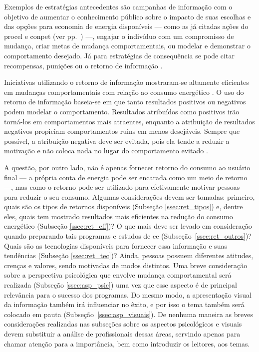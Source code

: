 Exemplos de estratégias antecedentes são campanhas de informação 
com o objetivo de aumentar o conhecimento público sobre o impacto de suas 
escolhas e das opções para economia de energia disponíveis --- como 
as já citadas ações do \gls{procel} e \gls{conpet} (ver pp.~\pageref{text:prog_cepel}) ---,
engajar o indivíduo com um compromisso de mudança, criar metas de mudança
comportamentais, ou modelar e demonstrar o comportamento desejado. Já para
estratégias de consequência se pode citar recompensas, punições ou o
retorno de informação \cite{aceee_2010_estudos_feedback,2009_epri}. 

Iniciativas utilizando o retorno de informação mostraram-se altamente eficientes
em mudanças comportamentais com relação ao consumo energético \cite{
aceee_2010_estudos_feedback,2009_epri,2012_schleich__austria,
2011_zhifeng_smart_energy_savings,2006_darby,2009_nber_studies_us,
ucla_studies_1975_2011_usa,2010_nilm_melhorando_pph_usa_37}. O uso do
retorno de informação baseia-se em que tanto resultados positivos ou
negativos podem modelar o comportamento. Resultados atribuídos como
positivos irão torná-los em comportamentos mais atraentes, enquanto a
atribuição de resultados negativos propiciam comportamentos ruins em
menos desejáveis. Sempre que possível, a atribuição negativa deve ser
evitada, pois ela tende a reduzir a motivação e não coloca nada no
lugar do comportamento evitado \cite{2010_aspectos_psicologicos_usa}.

A questão, por outro lado, não é apenas fornecer retorno do consumo ao usuário
final --- a própria conta de energia pode ser encarada como um meio de retorno
---, mas como o retorno pode ser utilizado para efetivamente motivar pessoas
para reduzir o seu consumo. Algumas considerações devem ser tomadas: primeiro,
quais são os tipos de retornos disponíveis (Subseção \ref{ssec:ret_tipos}) e,
dentre eles, quais tem mostrado resultados mais eficientes na redução do
consumo energético (Subseção \ref{ssec:ret_eff})? O que mais deve ser levado
em consideração quando preparando tais programas e estudos de \gls{ee}
(Subseção~\ref{ssec:ret_outros})? Quais são as tecnologias disponíveis para
fornecer essa informação e suas tendências (Subseção \ref{ssec:ret_tec})?
Ainda, pessoas possuem diferentes atitudes, crenças e valores, sendo motivadas
de modos distintos. Uma breve consideração sobre a perspectiva psicológica que
envolve mudança comportamental será realizada (Subseção \ref{ssec:asp_psic})
uma vez que esse aspecto é de principal relevância para o sucesso dos
programas.  Do mesmo modo, a apresentação visual da informação também irá
influenciar no êxito, e por isso o tema também será colocado em pauta
(Subseção~\ref{ssec:asp_visuais}). De nenhuma maneira as breves considerações
realizadas nas subseções sobre os aspectos psicológicos e visuais devem
substituir a análise de profissionais dessas áreas, servindo apenas para chamar
atenção para a importância, bem como introduzir os leitores, aos temas. 

